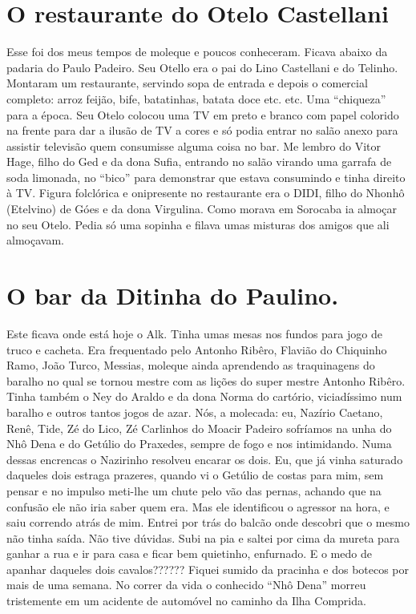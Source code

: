 \documentclass[12pt,brazil,]{book}
\begin{document}
\section{O restaurante do Otelo
Castellani}\label{o-restaurante-do-otelo-castellani}

Esse foi dos meus tempos de moleque e poucos conheceram. Ficava abaixo
da padaria do Paulo Padeiro. Seu Otello era o pai do Lino Castellani e
do Telinho. Montaram um restaurante, servindo sopa de entrada e depois o
comercial completo: arroz feijão, bife, batatinhas, batata doce etc.
etc. Uma ``chiqueza'' para a época. Seu Otelo colocou uma TV em preto e
branco com papel colorido na frente para dar a ilusão de TV a cores e só
podia entrar no salão anexo para assistir televisão quem consumisse
alguma coisa no bar. Me lembro do Vitor Hage, filho do Ged e da dona
Sufia, entrando no salão virando uma garrafa de soda limonada, no
``bico'' para demonstrar que estava consumindo e tinha direito à TV.
Figura folclórica e onipresente no restaurante era o DIDI, filho do
Nhonhô (Etelvino) de Góes e da dona Virgulina. Como morava em Sorocaba
ia almoçar no seu Otelo. Pedia só uma sopinha e filava umas misturas dos
amigos que ali almoçavam.

\section{O bar da Ditinha do
Paulino.}\label{o-bar-da-ditinha-do-paulino.}

Este ficava onde está hoje o Alk. Tinha umas mesas nos fundos para jogo
de truco e cacheta. Era frequentado pelo Antonho Ribêro, Flavião do
Chiquinho Ramo, João Turco, Messias, moleque ainda aprendendo as
traquinagens do baralho no qual se tornou mestre com as lições do super
mestre Antonho Ribêro. Tinha também o Ney do Araldo e da dona Norma do
cartório, viciadíssimo num baralho e outros tantos jogos de azar. Nós, a
molecada: eu, Nazírio Caetano, Renê, Tide, Zé do Lico, Zé Carlinhos do
Moacir Padeiro sofríamos na unha do Nhô Dena e do Getúlio do Praxedes,
sempre de fogo e nos intimidando. Numa dessas encrencas o Nazirinho
resolveu encarar os dois. Eu, que já vinha saturado daqueles dois
estraga prazeres, quando vi o Getúlio de costas para mim, sem pensar e
no impulso meti-lhe um chute pelo vão das pernas, achando que na
confusão ele não iria saber quem era. Mas ele identificou o agressor na
hora, e saiu correndo atrás de mim. Entrei por trás do balcão onde
descobri que o mesmo não tinha saída. Não tive dúvidas. Subi na pia e
saltei por cima da mureta para ganhar a rua e ir para casa e ficar bem
quietinho, enfurnado. E o medo de apanhar daqueles dois cavalos??????
Fiquei sumido da pracinha e dos botecos por mais de uma semana. No
correr da vida o conhecido ``Nhô Dena'' morreu tristemente em um
acidente de automóvel no caminho da Ilha Comprida.
\end{document}
